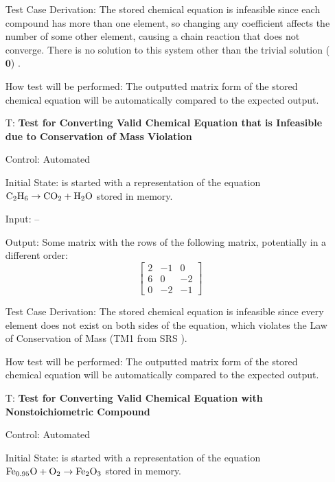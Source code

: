 \documentclass[12pt, titlepage]{article}
\newcounter{testnum} %
\begin{document}
\begin{enumerate}
    Test Case Derivation: The stored chemical equation is infeasible since
    each compound has more than one element, so changing any coefficient
    affects the number of some other element, causing a chain reaction that
    does not converge. There is no solution to this system other than the
    trivial solution ($\mathbf{0}$) \cite{hamid_balancing_2019}.

    How test will be performed: The outputted matrix form of the stored
    chemical equation will be automatically compared to the expected output.

  \item[T\refstepcounter{testnum}\thetestnum \label{test_convert_inf_cons_mass_valid}:]
    \textbf{Test for Converting Valid Chemical Equation that is Infeasible due
      to Conservation of Mass Violation}

    Control: Automated

    Initial State: \progname{} is started with a representation of the equation
    $\ce{C2H6} \rightarrow \ce{CO2} + \ce{H2O}$ stored in memory.

    Input: --

    Output: Some matrix with the rows of the following matrix, potentially in a
    different order:
    $$\begin{bmatrix}
        2 & -1 & 0  \\
        6 & 0  & -2 \\
        0 & -2 & -1
      \end{bmatrix}$$

    Test Case Derivation: The stored chemical equation is infeasible since
    every element does not exist on both sides of the equation, which violates
    the Law of Conservation of Mass (TM1 from SRS ).

    How test will be performed: The outputted matrix form of the stored
    chemical equation will be automatically compared to the expected output.

  \item[T\refstepcounter{testnum}\thetestnum \label{test_convert_nonstoich_valid}:]
    \textbf{Test for Converting Valid Chemical Equation with Nonstoichiometric
      Compound}

    Control: Automated

    Initial State: \progname{} is started with a representation of the equation
    $\ce{Fe_{0.95}O} + \ce{O2} \rightarrow \ce{Fe2O3}$
    \cite{doubtnut_when_nodate} stored in memory.


\end{enumerate}
\end{document}

